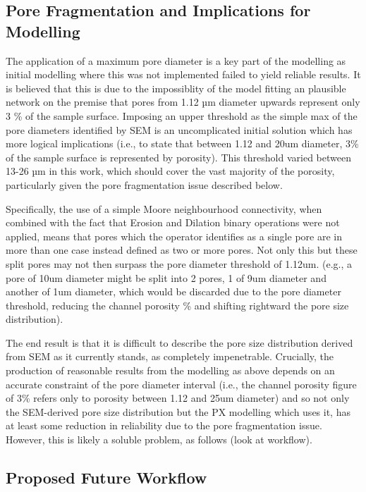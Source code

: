 \documentclass[review]{elsarticle}
\begin{document}
\subsection{Pore Fragmentation and Implications for Modelling}
The application of a maximum pore diameter is a key part of the modelling as
  initial modelling where this was not implemented failed to yield reliable
  results. It is believed that this is due to the impossiblity of the model
  fitting an plausible network on the premise that pores from 1.12 µm diameter
  upwards represent only 3 \% of the sample surface. Imposing an upper threshold
  as the simple max of the pore diameters identified by SEM is an uncomplicated
  initial solution which has more logical implications (i.e., to state that
  between 1.12 and 20um diameter, 3\% of the sample surface is represented by
  porosity). This threshold varied between 13-26 µm in this work, which should
  cover the vast majority of the porosity, particularly given the pore fragmentation
  issue described below.

  Specifically, the use of a simple Moore neighbourhood connectivity, when
  combined with the fact that Erosion and Dilation binary operations were not
  applied, means that pores which the operator identifies as a single pore are
  in more than one case instead defined as two or more pores. Not only this but
  these split pores may not then surpass the pore diameter threshold of 1.12um.
  (e.g., a pore of 10um diameter might be split into 2 pores, 1 of 9um diameter
  and another of 1um diameter, which would be discarded due to the pore diameter
  threshold, reducing the channel porosity \% and shifting rightward the pore
  size distribution).

  The end result is that it is difficult to describe the pore size distribution
  derived from SEM as it currently stands, as completely impenetrable.
  Crucially, the production of reasonable results from the modelling as above
  depends on an accurate constraint of the pore diameter interval (i.e., the
  channel porosity figure of 3\% refers only to porosity between 1.12 and 25um
  diameter) and so not only the SEM-derived pore size distribution but the PX
  modelling which uses it, has at least some reduction in reliability due to the
  pore fragmentation issue. However, this is likely a soluble problem, as
  follows (look at workflow).

    \subsection{Proposed Future Workflow}
\end{document}
